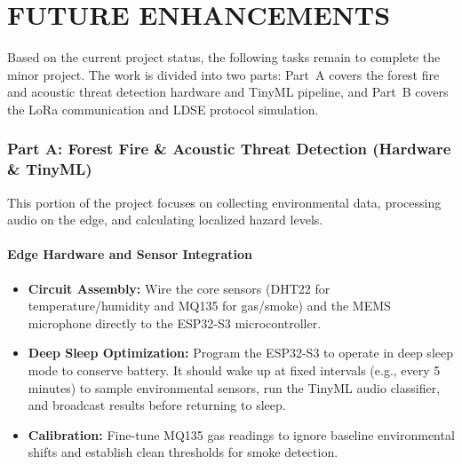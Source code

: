 \chapter{FUTURE ENHANCEMENTS}

Based on the current project status, the following tasks remain to complete
the minor project. The work is divided into two parts: Part~A covers the
forest fire and acoustic threat detection hardware and TinyML pipeline, and
Part~B covers the LoRa communication and LDSE protocol simulation.

\subsection*{Part A: Forest Fire \& Acoustic Threat Detection (Hardware \& TinyML)}

This portion of the project focuses on collecting environmental data,
processing audio on the edge, and calculating localized hazard levels.

\subsubsection{Edge Hardware and Sensor Integration}

\begin{itemize}
    \item \textbf{Circuit Assembly:} Wire the core sensors (DHT22 for
    temperature/humidity and MQ135 for gas/smoke) and the MEMS microphone
    directly to the ESP32-S3 microcontroller.

    \item \textbf{Deep Sleep Optimization:} Program the ESP32-S3 to operate
    in deep sleep mode to conserve battery. It should wake up at fixed
    intervals (e.g., every 5 minutes) to sample environmental sensors, run
    the TinyML audio classifier, and broadcast results before returning to
    sleep.

    \item \textbf{Calibration:} Fine-tune MQ135 gas readings to ignore
    baseline environmental shifts and establish clean thresholds for smoke
    detection.
\end{itemize}

